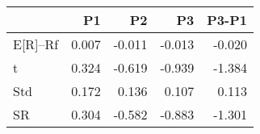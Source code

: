 \begin{tabular}{lrrrr}
\toprule
 & P1 & P2 & P3 & P3-P1 \\
\midrule
E[R]--Rf & 0.007 & -0.011 & -0.013 & -0.020 \\
t & 0.324 & -0.619 & -0.939 & -1.384 \\
Std & 0.172 & 0.136 & 0.107 & 0.113 \\
SR & 0.304 & -0.582 & -0.883 & -1.301 \\
\bottomrule
\end{tabular}
